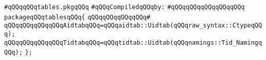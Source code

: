 \label{src/lib/c-kit/src/ast/tables.pkg}
\verb|#qQQqqQQqtables.pkgqQQq|\newline
\newline
\verb|#qQQqCompiledqQQqby:|\newline
\verb|#qQQqqQQqqQQqqQQqqQQq|\newline
\newline
\verb|packageqQQqtablesqQQq{|\newline
\verb|qQQqqQQqqQQqqQQq#|\newline
\verb|qQQqqQQqqQQqqQQqAidtabqQQq=qQQqaidtab::Uidtab(qQQqraw_syntax::CtypeqQQq);|\newline
\verb|qQQqqQQqqQQqqQQqTidtabqQQq=qQQqtidtab::Uidtab(qQQqnamings::Tid_NamingqQQq);|\newline
\verb|};|\newline

